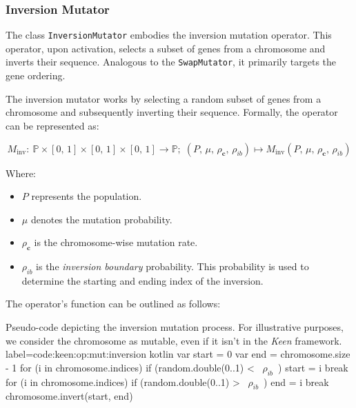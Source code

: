 
\subsubsection{Inversion Mutator}
\label{sec:keen:op:mut:inversion}
  The class \texttt{InversionMutator} embodies the inversion mutation operator. 
  This operator, upon activation, selects a subset of genes from a chromosome 
  and inverts their sequence. Analogous to the \texttt{SwapMutator}, it 
  primarily targets the gene ordering.

  \begin{definition}
  \label{def:keen:op:mut:inversion}
    The inversion mutator works by selecting a random subset of genes from a 
    chromosome and subsequently inverting their sequence. Formally, the 
    operator can be represented as:

    \begin{equation}
      M_\mathrm{inv} :\: 
        \mathbb{P} \times [0,\, 1] \times [0,\, 1] \times [0,\, 1] 
          \to \mathbb{P};\;
      (P,\, \mu,\, \rho_\mathbf{c},\, \rho_{ib}) 
        \mapsto M_\mathrm{inv}(P,\, \mu,\, \rho_\mathbf{c},\, \rho_{ib})
    \end{equation}

    Where:
    \begin{itemize}
        \item \(P\) represents the population.
        \item \(\mu\) denotes the mutation probability.
        \item \(\rho_\mathbf{c}\) is the chromosome-wise mutation rate.
        \item \(\rho_{ib}\) is the \textit{inversion boundary} probability. 
          This probability is used to determine the starting and ending index 
          of the inversion.
    \end{itemize}
  \end{definition}

  The operator's function can be outlined as follows:

  \begin{code}{
      Pseudo-code depicting the inversion mutation process. For illustrative
      purposes, we consider the chromosome as mutable, even if it isn't in the
      \textit{Keen} framework.
    }{
      label=code:keen:op:mut:inversion
    }{kotlin}
      var start = 0
      var end = chromosome.size - 1
      for (i in chromosome.indices) {
          if (random.double(0..1) < ~$\rho_{ib}$~) {
              start = i
              break
          }
      }
      for (i in chromosome.indices) {
          if (random.double(0..1) > ~$\rho_{ib}$~) {
              end = i
              break
          }
      }
      chromosome.invert(start, end)
  \end{code}

